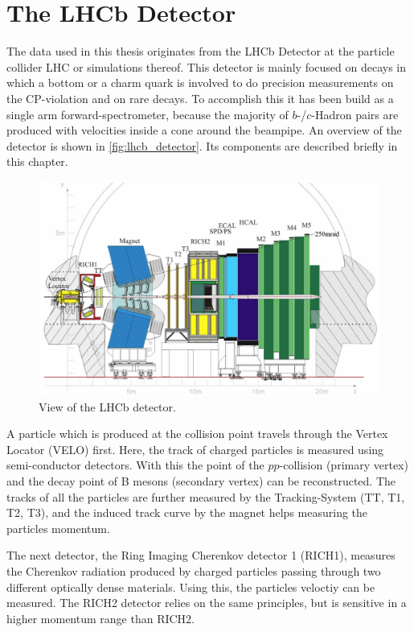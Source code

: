 \chapter{The LHCb Detector}

The data used in this thesis originates from the LHCb Detector at the particle collider LHC or simulations thereof.
This detector is mainly focused on decays in which a bottom or a charm quark is involved to do precision measurements on the CP-violation and on rare decays. 
To accomplish this it has been build as a single arm forward-spectrometer, because the majority of $b$-/$c$-Hadron pairs are produced with velocities inside a cone around the beampipe.
An overview of the detector is shown in \autoref{fig:lhcb_detector}.
Its components are described briefly in this chapter.

\begin{figure}
    \centering
    \includegraphics[width=\textwidth]{images/lhcb_detector.png}
    \caption{View of the LHCb detector. \cite{lhcb_detector}}
    \label{fig:lhcb_detector}
\end{figure}

A particle which is produced at the collision point travels through the Vertex Locator (VELO) first. 
Here, the track of charged particles is measured using semi-conductor detectors. 
With this the point of the $pp$-collision (primary vertex) and the decay point of B mesons (secondary vertex) can be reconstructed.
The tracks of all the particles are further measured by the Tracking-System (TT, T1, T2, T3), and the induced track curve by the magnet helps measuring the particles momentum.

The next detector, the Ring Imaging Cherenkov detector 1 (RICH1), measures the Cherenkov radiation produced by charged particles passing through two different optically dense materials. 
Using this, the particles veloctiy can be measured. The RICH2 detector relies on the same principles, but is sensitive in a higher momentum range than RICH2.

